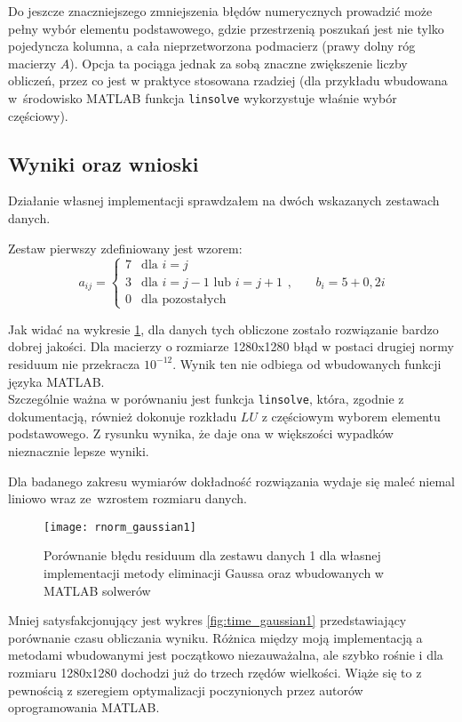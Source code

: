 \documentclass[12pt]{article}
\begin{document}
Do jeszcze znaczniejszego zmniejszenia błędów numerycznych prowadzić może pełny wybór elementu podstawowego, gdzie przestrzenią poszukań jest nie tylko pojedyncza kolumna, a cała nieprzetworzona podmacierz (prawy dolny róg macierzy \(A\)). Opcja ta pociąga jednak za sobą znaczne zwiększenie liczby obliczeń, przez co jest w praktyce stosowana rzadziej (dla przykładu wbudowana w~środowisko MATLAB funkcja \texttt{linsolve} wykorzystuje właśnie wybór częściowy).

\subsection{Wyniki oraz wnioski}
Działanie własnej implementacji sprawdzałem na dwóch wskazanych zestawach danych.

Zestaw pierwszy zdefiniowany jest wzorem:
\[
a_{ij} =
\begin{cases}
7 & \text{dla \(i = j\)} \\
3 & \text{dla \(i = j-1\) lub \(i = j+1\)} \\
0 & \text{dla pozostałych}
\end{cases}
\text{,}
\quad \quad
b_{i} = 5 + 0,2i
\]

Jak widać na wykresie \ref{fig:rnorm_gaussian1}, dla danych tych obliczone zostało rozwiązanie bardzo dobrej jakości. Dla macierzy o rozmiarze 1280x1280 błąd w postaci drugiej normy residuum nie przekracza \(10^{-12}\). Wynik ten nie odbiega od wbudowanych funkcji języka MATLAB. \\
Szczególnie ważna w porównaniu jest funkcja \texttt{linsolve}, która, zgodnie z dokumentacją, również dokonuje rozkładu \(LU\) z częściowym wyborem elementu podstawowego. Z rysunku wynika, że daje ona w większości wypadków nieznacznie lepsze wyniki.

Dla badanego zakresu wymiarów dokładność rozwiązania wydaje się maleć niemal liniowo wraz ze~wzrostem rozmiaru danych.

\begin{figure}[!htbp]
\centering
\texttt{[image: rnorm\_gaussian1]}
\centering
\caption{Porównanie błędu residuum dla zestawu danych 1 dla własnej implementacji metody eliminacji Gaussa oraz wbudowanych w MATLAB solwerów}
\label{fig:rnorm_gaussian1}
\end{figure}
\FloatBarrier

Mniej satysfakcjonujący jest wykres \ref{fig:time_gaussian1} przedstawiający porównanie czasu obliczania wyniku. Różnica między moją implementacją a metodami wbudowanymi jest początkowo niezauważalna, ale szybko rośnie i dla rozmiaru 1280x1280 dochodzi już do trzech rzędów wielkości. Wiąże się to z pewnością z szeregiem optymalizacji poczynionych przez autorów oprogramowania MATLAB.
\end{document}
